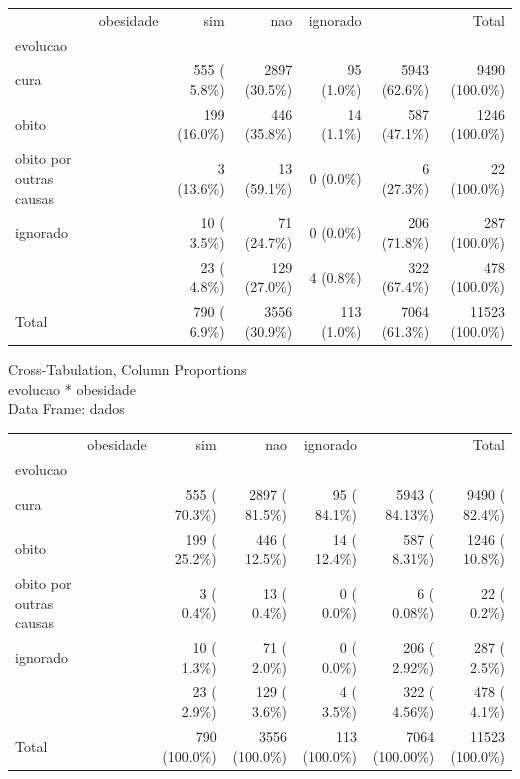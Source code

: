 \documentclass[
  letterpaper,
  DIV=11,
  numbers=noendperiod]{scrreprt}
\newenvironment{Shaded}{\begin{snugshade}}{\end{snugshade}}
\newcommand{\AttributeTok}[1]{\textcolor[rgb]{0.40,0.45,0.13}{#1}}
\newcommand{\FunctionTok}[1]{\textcolor[rgb]{0.28,0.35,0.67}{#1}}
\newcommand{\NormalTok}[1]{\textcolor[rgb]{0.00,0.23,0.31}{#1}}
\newcommand{\SpecialCharTok}[1]{\textcolor[rgb]{0.37,0.37,0.37}{#1}}
\newcommand{\StringTok}[1]{\textcolor[rgb]{0.13,0.47,0.30}{#1}}
\begin{document}
\begin{longtable}[]{@{}lrrrrrr@{}}
\toprule()
\endhead
& obesidade & sim & nao & ignorado & & Total \\
evolucao & & & & & & \\
cura & & 555 ( 5.8\%) & 2897 (30.5\%) & 95 (1.0\%) & 5943 (62.6\%) &
9490 (100.0\%) \\
obito & & 199 (16.0\%) & 446 (35.8\%) & 14 (1.1\%) & 587 (47.1\%) & 1246
(100.0\%) \\
obito por outras causas & & 3 (13.6\%) & 13 (59.1\%) & 0 (0.0\%) & 6
(27.3\%) & 22 (100.0\%) \\
ignorado & & 10 ( 3.5\%) & 71 (24.7\%) & 0 (0.0\%) & 206 (71.8\%) & 287
(100.0\%) \\
& & 23 ( 4.8\%) & 129 (27.0\%) & 4 (0.8\%) & 322 (67.4\%) & 478
(100.0\%) \\
Total & & 790 ( 6.9\%) & 3556 (30.9\%) & 113 (1.0\%) & 7064 (61.3\%) &
11523 (100.0\%) \\
\bottomrule()
\end{longtable}

\begin{Shaded}
\end{Shaded}

Cross-Tabulation, Column Proportions\\
evolucao * obesidade\\
Data Frame: dados

\begin{longtable}[]{@{}lrrrrrr@{}}
\toprule()
\endhead
& obesidade & sim & nao & ignorado & & Total \\
evolucao & & & & & & \\
cura & & 555 ( 70.3\%) & 2897 ( 81.5\%) & 95 ( 84.1\%) & 5943 ( 84.13\%)
& 9490 ( 82.4\%) \\
obito & & 199 ( 25.2\%) & 446 ( 12.5\%) & 14 ( 12.4\%) & 587 ( 8.31\%) &
1246 ( 10.8\%) \\
obito por outras causas & & 3 ( 0.4\%) & 13 ( 0.4\%) & 0 ( 0.0\%) & 6 (
0.08\%) & 22 ( 0.2\%) \\
ignorado & & 10 ( 1.3\%) & 71 ( 2.0\%) & 0 ( 0.0\%) & 206 ( 2.92\%) &
287 ( 2.5\%) \\
& & 23 ( 2.9\%) & 129 ( 3.6\%) & 4 ( 3.5\%) & 322 ( 4.56\%) & 478 (
4.1\%) \\
Total & & 790 (100.0\%) & 3556 (100.0\%) & 113 (100.0\%) & 7064
(100.00\%) & 11523 (100.0\%) \\
\bottomrule()
\end{longtable}
\end{document}
